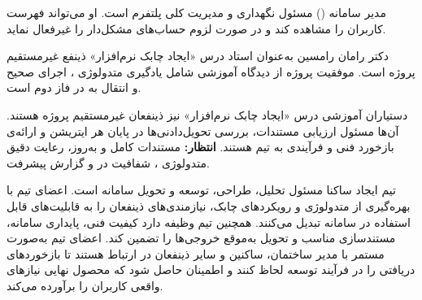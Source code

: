 مدیر سامانه () مسئول نگهداری و مدیریت کلی پلتفرم است.
او می‌تواند فهرست کاربران را مشاهده کند و در صورت لزوم حساب‌های مشکل‌دار را غیرفعال نماید.

دکتر رامان رامسین به‌عنوان استاد درس «ایجاد چابک نرم‌افزار» ذینفع غیرمستقیم پروژه است.
موفقیت پروژه از دیدگاه آموزشی شامل یادگیری متدولوژی ، اجرای صحیح 
و انتقال به  در فاز دوم است.

دستیاران آموزشی درس «ایجاد چابک نرم‌افزار» نیز ذینفعان غیرمستقیم پروژه هستند.
آن‌ها مسئول ارزیابی مستندات، بررسی تحویل‌دادنی‌ها در پایان هر ایتریشن
و ارائه‌ی بازخورد فنی و فرآیندی به تیم هستند.
\textbf{انتظار:} مستندات کامل و به‌روز، رعایت دقیق متدولوژی ، شفافیت در  و گزارش پیشرفت.


تیم ایجاد ساکنا مسئول تحلیل، طراحی، توسعه و تحویل سامانه است.
اعضای تیم با بهره‌گیری از متدولوژی  و رویکردهای چابک، نیازمندی‌های ذینفعان را
به قابلیت‌های قابل استفاده در سامانه تبدیل می‌کنند. همچنین تیم وظیفه دارد کیفیت فنی،
پایداری سامانه، مستندسازی مناسب و تحویل به‌موقع خروجی‌ها را تضمین کند.
اعضای تیم به‌صورت مستمر با مدیر ساختمان، ساکنین و سایر ذینفعان در ارتباط هستند تا
بازخوردهای دریافتی را در فرآیند توسعه لحاظ کنند و اطمینان حاصل شود که محصول نهایی
نیازهای واقعی کاربران را برآورده می‌کند.

